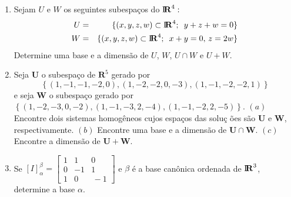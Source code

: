 \documentclass{report}
\begin{document}
\begin{Exercise}
\begin{enumerate}

\item \label{29lista3} Sejam $U$ e $W$ os seguintes subespa\c{c}os do $%
\mbox{${\rm I}\!\mbox{\boldmath $ {\rm R}$}$}%
^{4}:$%
\begin{eqnarray*}
U &=&\{(x,y,z,w)\subset
\mbox{${\rm I}\!\mbox{\boldmath $ {\rm R}$}$}%
^{4};\text{ }\,y+z+w=0\} \\
W &=&\{(x,y,z,w)\subset
\mbox{${\rm I}\!\mbox{\boldmath $ {\rm R}$}$}%
^{4};\text{ }\,x+y=0,\,z=2w\}
\end{eqnarray*}
Determine uma base e a dimens\~{a}o de $U$, $W$, $U\cap W$ e $U+W.$


\item \label{30lista3} Seja $\mathbf{U}$ o subespa\c{c}o de
$\mathbf{R}^{5}$ gerado por
\[
\left\{ (1,-1,-1,-2,0),(1,-2,-2,0,-3),(1,-1,-2,-2,1)\right\}
\]
e seja $\mathbf{W}$ o subespa\c{c}o gerado por $\left\{
(1,-2,-3,0,-2),(1,-1,-3,2,-4),(1,-1,-2,2,-5)\right\} .$ \newline
$(a)$ Encontre dois sistemas homog\^{e}neos cujos espa\c{c}os das solu\c{c}%
\~{o}es s\~{a}o $\mathbf{U}$ e $\mathbf{W}$, respectivamente.\newline
$(b)$ Encontre uma base e a dimens\~{a}o de $\mathbf{U}\cap \mathbf{W}$.%
\newline
$(c)$ Encontre a dimens\~{a}o de $\mathbf{U}+\mathbf{W}$.


\item \label{31lista3} Se $\left[ I\right] _{\alpha }^{\beta
}=\left[
\begin{array}{rrr}
1 & 1 & 0 \\
0 & -1 & 1 \\
1 & 0 & \,-1
\end{array}
\right] $ e $\beta $ \'{e} a base can\^{o}nica ordenada de $%
\mbox{${\rm I}\!\mbox{\boldmath $ {\rm R}$}$}%
^{3}$, determine a base $\alpha .$


\end{enumerate}
\end{Exercise}
\end{document}
